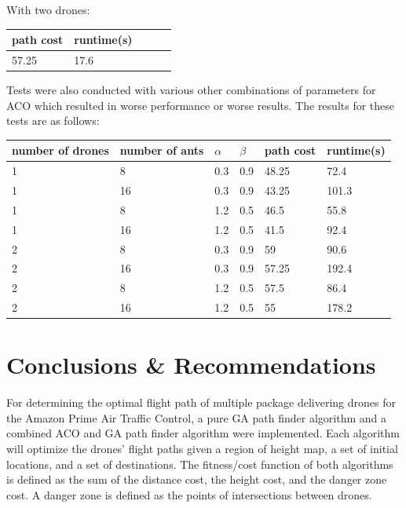 \documentclass[conference]{IEEEtran}
\begin{document}
With two drones:
\begin{center}
\begin{tabular}{ | m{1cm} | m{1cm}| m{1cm} | m{1.5cm} | m{1.5cm} |} 
\hline
path cost & runtime(s) \\ 
\hline
57.25 & 17.6 \\
\hline
\end{tabular}
\end{center}

Tests were also conducted with various other combinations of parameters for ACO which resulted in worse performance or worse results. The results for these tests are as follows:
\begin{center}
\begin{tabular}{ | m{1cm} | m{1cm}| m{1cm} | m{1.5cm} | m{1.5cm} | m{1.5cm}} 
\hline
number of drones & number of ants & $\alpha$ & $\beta$ & path cost & runtime(s) \\ 
\hline
1 & 8 & 0.3 & 0.9 & 48.25 & 72.4 \\
\hline
1 & 16 & 0.3 & 0.9 & 43.25 & 101.3 \\ 
\hline
1 & 8 & 1.2 & 0.5 & 46.5 & 55.8 \\
\hline
1 & 16 & 1.2 & 0.5 & 41.5 & 92.4 \\
\hline
2 & 8 & 0.3 & 0.9 & 59 & 90.6 \\
\hline
2 & 16 & 0.3 & 0.9 & 57.25 & 192.4 \\ 
\hline
2 & 8 & 1.2 & 0.5 & 57.5 & 86.4 \\
\hline
2 & 16 & 1.2 & 0.5 & 55 & 178.2 \\
\hline
\end{tabular}
\end{center}

\section{Conclusions \& Recommendations}
For determining the optimal flight path of multiple package delivering drones for the Amazon Prime Air Traffic Control, a pure GA path finder algorithm and a combined ACO and GA path finder algorithm were implemented. Each algorithm will optimize the drones' flight paths given a region of height map, a set of initial locations, and a set of destinations. The fitness/cost function of both algorithms is defined as the sum of the distance cost, the height cost, and the danger zone cost. A danger zone is defined as the points of intersections between drones.
\end{document}
